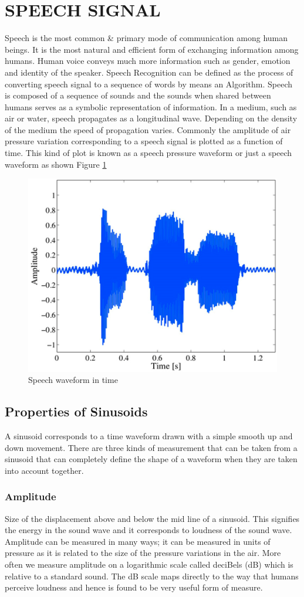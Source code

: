 \documentclass[a4paper,12pt]{report} %
\begin{document}
\section{SPEECH SIGNAL}
Speech is the most common \& primary mode of communication among human beings. It is the most natural and efficient form of exchanging information among humans. Human voice conveys much more information such as gender, emotion and identity of the speaker. Speech Recognition can be defined as the process of converting speech signal to a sequence of words by means an Algorithm. Speech is composed of a sequence of sounds and the sounds when shared between humans serves as a symbolic representation of information. In a medium, such as air or water, speech propagates as a longitudinal wave. Depending on the density of the medium the speed of propagation varies. Commonly the amplitude of air pressure variation corresponding to a speech signal is plotted as a function of time. This kind of plot is known as a speech pressure waveform or just a speech waveform as shown Figure \ref{fig1}
\begin{figure}
\begin{center}
\includegraphics[width=0.6\linewidth]{figure1}
\caption{Speech waveform in time}
\label{fig1}
\end{center}
\end{figure}
\subsection{Properties of Sinusoids}
A sinusoid corresponds to a time waveform drawn with a simple smooth up and down movement. There are three kinds of measurement that can be taken from a sinusoid that can completely define the shape of a waveform when they are taken into account together. 
\subsubsection{Amplitude}
Size of the displacement above and below the mid line of a sinusoid. This signifies the energy in the sound wave and it corresponds to loudness of the sound wave. Amplitude can be measured in many ways; it can be measured in units of pressure as it is related to the size of the pressure variations in the air. More often we measure amplitude on a logarithmic scale called deciBels (dB) which is relative to a standard sound. The dB scale maps directly to the way that humans perceive loudness and hence is found to be very useful form of measure. 
\end{document}
